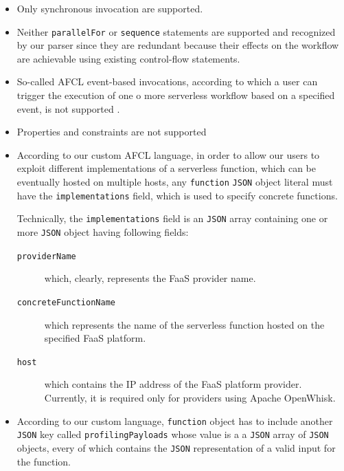 \documentclass[12pt,a4paper]{report}
\begin{document}
\begin{itemize}
	\item Only synchronous invocation are supported.
	
	\item Neither \texttt{parallelFor} or \texttt{sequence} statements are supported and recognized by our parser since they are redundant because their effects on the workflow are achievable using existing control-flow statements.
	
	\item So-called AFCL event-based invocations, according to which a user can trigger the execution of one o more serverless workflow based on a specified event, is not supported \cite{AFCL}.   
	
	\item Properties and constraints are not supported
	
	\item According to our custom AFCL language, in order to allow our users to exploit different implementations of a serverless function, which can be eventually hosted on multiple hosts, any \texttt{function} \texttt{JSON} object literal must have the \texttt{implementations} field, which is used to specify concrete functions.
	
	Technically, the \texttt{implementations} field is an \texttt{JSON} array containing one or more \texttt{JSON} object having following fields:
	
	\begin{description}
		\item[\texttt{providerName}] which, clearly, represents the FaaS provider name. 
		
		\item[\texttt{concreteFunctionName}] which represents the name of the serverless function hosted on the specified FaaS platform.
		
		\item[\texttt{host}] which contains the IP address of the FaaS platform provider. Currently, it is required only for providers using Apache OpenWhisk.  
	\end{description}

	\item According to our custom language, \texttt{function} object has to include another \texttt{JSON} key called \texttt{profilingPayloads} whose value is a a \texttt{JSON} array of \texttt{JSON} objects, every of which contains the \texttt{JSON} representation of a valid input for the function.
	

\end{itemize}
\end{document}
